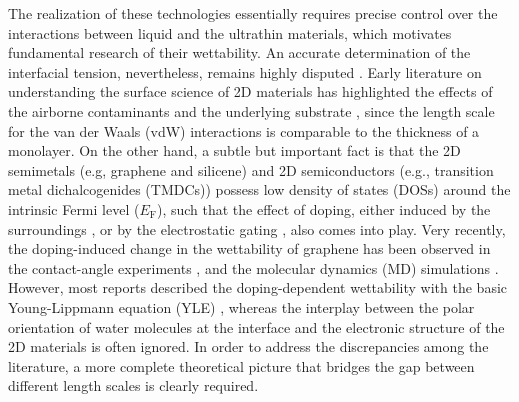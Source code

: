 \documentclass[journal=ancac3,manuscript=article,email=true]{achemso}
\begin{document}
The realization of these technologies essentially requires precise
control over the interactions between liquid and the ultrathin
materials, which motivates fundamental research of their
wettability. An accurate determination of the interfacial tension,
nevertheless, remains highly disputed
\cite{taherian2013what,Kozbial_2015,Parobek_2015,Govind_Rajan_2016}. Early
literature on understanding the surface science of 2D materials has
highlighted the effects of the airborne contaminants
\cite{li_effect_2013,Xu_2013_withwhat,kozbial_study_2014,Kozbial_2015,Chow_2015}
and the underlying substrate
\cite{raj_wettability_2013,rafiee_wetting_2012,shih_breakdown_2012,shih_wetting_2013},
since the length scale for the van der Waals (vdW) interactions is
comparable to the thickness of a monolayer. On the other hand, a
subtle but important fact is that the 2D semimetals (e.g, graphene and
silicene) and 2D semiconductors (e.g., transition metal
dichalcogenides (TMDCs)) possess low density of states (DOSs) around
the intrinsic Fermi level (\(E_{\mathrm{F}}\)), such that the effect of
doping, either induced by the surroundings
\cite{Chen_2013,Varchon_2007,Giovannetti_2008}, or by the electrostatic
gating \cite{Das_2008,Perera_2013}, also comes into play. Very recently,
the doping-induced change in the wettability of graphene has been
observed in the contact-angle experiments
\cite{hong_mechanism_2016,goniszewski_correlation_2016,ashraf_doping-induced_2016},
and the molecular dynamics (MD) simulations
\cite{ostrowski_tunable_2014,ren_interfacial_2015,Taherian_2015,daub_electrowetting_2007}. However,
most reports described the doping-dependent wettability with the basic
Young-Lippmann equation (YLE) \cite{Lippmann_1875}, whereas the
interplay between the polar orientation of water molecules at the
interface \cite{Shen_2006} and the electronic structure of the 2D
materials is often ignored. In order to address the discrepancies
among the literature, a more complete theoretical picture that bridges
the gap between different length scales is clearly required.
\end{document}
